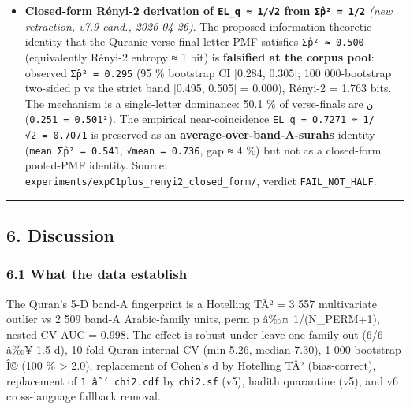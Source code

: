 \documentclass[
]{article}
\begin{document}
\begin{itemize}
  morphology-specific \texttt{T\_canon} (CamelTools roots) and is
  reduced to \textbf{1.10×} under \texttt{T\_lang}. The Quran-band-A
  \texttt{T\_canon} 39.7 \% vs Arabic-ctrl-max 0.10 \% anomaly is
  unaffected; only the \textbf{cross-tradition / language-agnostic}
  generalisation is retracted. Source:
  \texttt{experiments/expP8\_T\_pos\_cross\_tradition/}, verdict
  \texttt{FAIL\_QURAN\_NOT\_HIGHEST}.
\item
  \textbf{Closed-form Rényi-2 derivation of \texttt{EL\_q\ ≈\ 1/√2} from
  \texttt{Σp̂²\ =\ 1/2}} \emph{(new retraction, v7.9 cand., 2026-04-26)}.
  The proposed information-theoretic identity that the Quranic
  verse-final-letter PMF satisfies \texttt{Σp̂²\ ≈\ 0.500} (equivalently
  Rényi-2 entropy ≈ 1 bit) is \textbf{falsified at the corpus pool}:
  observed \texttt{Σp̂²\ =\ 0.295} (95 \% bootstrap CI {[}0.284,
  0.305{]}; 100 000-bootstrap two-sided p vs the strict band {[}0.495,
  0.505{]} = 0.000), Rényi-2 = 1.763 bits. The mechanism is a
  single-letter dominance: 50.1 \% of verse-finals are \texttt{ن}
  (\texttt{0.501²\ =\ 0.251}). The empirical near-coincidence
  \texttt{EL\_q\ =\ 0.7271\ ≈\ 1/√2\ =\ 0.7071} is preserved as an
  \textbf{average-over-band-A-surahs} identity
  (\texttt{mean\ Σp̂²\ =\ 0.541}, \texttt{√mean\ =\ 0.736}, gap ≈ 4 \%)
  but not as a closed-form pooled-PMF identity. Source:
  \texttt{experiments/expC1plus\_renyi2\_closed\_form/}, verdict
  \texttt{FAIL\_NOT\_HALF}.
\end{itemize}

\begin{center}\rule{0.5\linewidth}{0.5pt}\end{center}

\subsection{6. Discussion}\label{discussion}

\subsubsection{6.1 What the data
establish}\label{what-the-data-establish}

The Quran's 5-D band-A fingerprint is a Hotelling TÂ² = 3 557
multivariate outlier vs 2 509 band-A Arabic-family units, perm p â‰¤
1/(N\_PERM+1), nested-CV AUC = 0.998. The effect is robust under
leave-one-family-out (6/6 â‰¥ 1.5 d), 10-fold Quran-internal CV (min
5.26, median 7.30), 1 000-bootstrap Î© (100 \% \textgreater{} 2.0),
replacement of Cohen's d by Hotelling TÂ² (bias-correct), replacement of
\texttt{1\ âˆ’\ chi2.cdf} by \texttt{chi2.sf} (v5), hadith quarantine
(v5), and v6 cross-language fallback removal.
\end{document}
